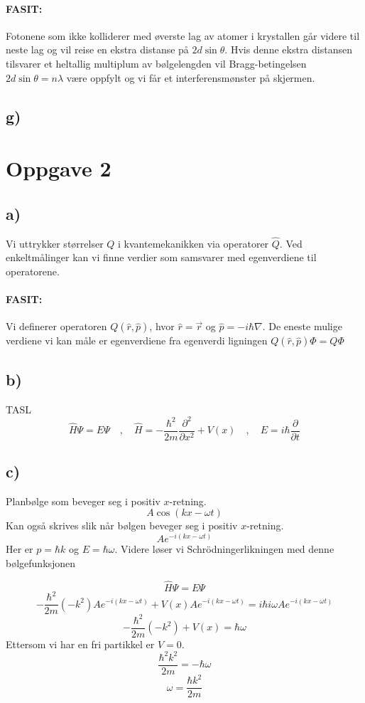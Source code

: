 \documentclass{article}
\begin{document}
    \paragraph*{FASIT: }
      Fotonene som ikke kolliderer med øverste lag av atomer i krystallen går videre til neste lag og vil reise en ekstra distanse på $2d\sin θ$. Hvis denne ekstra distansen tilsvarer et heltallig multiplum av bølgelengden vil Bragg-betingelsen $2d\sin θ = nλ$ være oppfylt og vi får et interferensmønster på skjermen. 
    
  \subsection*{g)}
    

\section*{Oppgave 2}
  \subsection*{a)}
    Vi uttrykker størrelser $Q$ i kvantemekanikken via operatorer $\hat{Q}$. Ved enkeltmålinger kan vi finne verdier som samsvarer med egenverdiene til operatorene. 
    
    \paragraph*{FASIT: }
      Vi definerer operatoren $Q(\hat{r}, \hat{p})$, hvor $\hat{r} = \vec{r}$ og $\hat{p} = - iℏ∇$. De eneste mulige verdiene vi kan måle er egenverdiene fra egenverdi ligningen $Q(\hat{r}, \hat{p})Φ = QΦ$
  
  \subsection*{b)}
    TASL
    \[
    \hat{H}Ψ = EΨ \quad , \quad \hat{H} = -\frac{ℏ^2}{2m} \frac{∂^2 }{∂ x^2} + V(x) \quad , \quad E = iℏ \frac{∂ }{∂ t}
    \]
  
  \subsection*{c)}
    Planbølge som beveger seg i positiv $x$-retning.
    \[
    A \cos (kx - ωt)
    \]
    Kan også skrives slik når bølgen beveger seg i positiv $x$-retning. 
    \[
    A e^{-i(kx - ωt)}
    \]
    Her er $p = ℏk$ og $E = ℏω$. Videre løser vi Schrödningerlikningen med denne bølgefunksjonen
    
    \[
    \hat{H}Ψ = EΨ 
    \]
    \[
    - \frac{ℏ^2}{2m} (-k^2)A e^{-i(kx - ωt)} + V(x)Ae^{-i(kx - ωt)} = iℏ iωAe^{-i(kx - ωt)}
    \]
    \[
      - \frac{ℏ^2}{2m} (-k^2) + V(x) = ℏω
    \]
    Ettersom vi har en fri partikkel er $V = 0$. 
    \[
    \frac{ℏ^2k^2}{2m} = -ℏω
    \]
    \[
    ω = \frac{ℏk^2}{2m}
    \]
\end{document}
